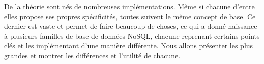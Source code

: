 De la théorie sont nés de nombreuses implémentations. Même si chacune d'entre elles propose ses propres spécificités, toutes suivent le même concept de base. Ce dernier est vaste et permet de faire beaucoup de choses, ce qui a donné naissance à plusieurs familles de base de données NoSQL, chacune reprenant certains points clés et les implémentant d'une manière différente. Nous allons présenter les plus grandes et montrer les différences et l'utilité de chacune. 
